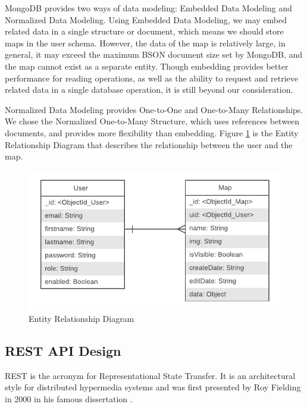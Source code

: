 MongoDB provides two ways of data modeling: Embedded Data Modeling and Normalized Data Modeling. Using Embedded Data Modeling, we may embed related data in a single structure or document, which means we should store maps in the user schema. However, the data of the map is relatively large, in general, it may exceed the maximum BSON document size set by MongoDB, and the map cannot exist as a separate entity. Though embedding provides better performance for reading operations, as well as the ability to request and retrieve related data in a single database operation, it is still beyond our consideration.

Normalized Data Modeling provides One-to-One and One-to-Many Relationships. We chose the Normalized One-to-Many Structure, which uses references between documents, and provides more flexibility than embedding. Figure \ref{fig:ER Diagram} is the Entity Relationship Diagram that describes the relationship between the user and the map.

\begin{figure}[htbp]
\centering
\includegraphics[width=\textwidth]{section03/assets/ER_Diagram.png}
\caption[Entity Relationship Diagram]{\label{fig:ER Diagram}Entity Relationship Diagram}
\end{figure}

\subsection{REST API Design}
\label{sec:Design>REST API Design}
REST is the acronym for Representational State Transfer. It is an architectural style for distributed hypermedia systems and was first presented by Roy Fielding in 2000 in his famous dissertation \cite{Fielding00architecturalstyles}.

